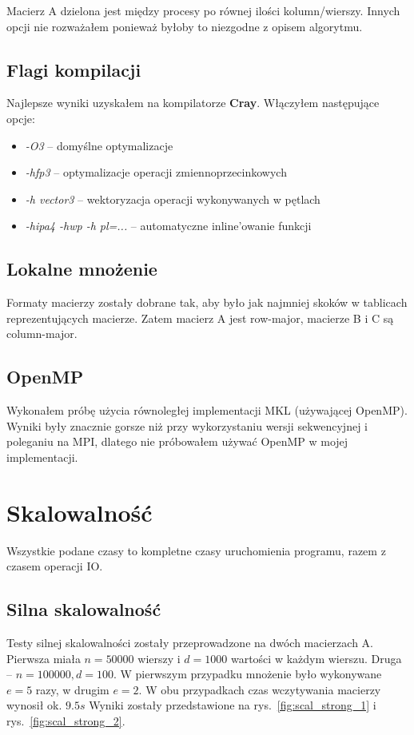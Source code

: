 \documentclass{article}
\begin{document}
Macierz A dzielona jest między procesy po równej ilości kolumn/wierszy. 
Innych opcji nie rozważałem ponieważ byłoby to niezgodne z opisem algorytmu.

\subsection{Flagi kompilacji}
Najlepsze wyniki uzyskałem na kompilatorze \textbf{Cray}. Włączyłem następujące opcje:
\begin{itemize}
  \item \emph{-O3} -- domyślne optymalizacje
  \item \emph{-hfp3} -- optymalizacje operacji zmiennoprzecinkowych
  \item \emph{-h vector3} -- wektoryzacja operacji wykonywanych w pętlach
  \item \emph{-hipa4 -hwp -h pl=...} -- automatyczne inline'owanie funkcji
\end{itemize}

\subsection{Lokalne mnożenie}
Formaty macierzy zostały dobrane tak, aby było jak najmniej skoków w tablicach reprezentujących macierze.
Zatem macierz A jest row-major, macierze B i C są column-major.

\subsection{OpenMP}
Wykonałem próbę użycia równoległej implementacji MKL (używającej OpenMP). Wyniki były znacznie gorsze niż przy
wykorzystaniu wersji sekwencyjnej i poleganiu na MPI, dlatego nie próbowałem używać OpenMP w mojej implementacji.

\section{Skalowalność}

Wszystkie podane czasy to kompletne czasy uruchomienia programu, razem z czasem operacji IO. 

\subsection{Silna skalowalność}

Testy silnej skalowalności zostały przeprowadzone na dwóch macierzach A. 
Pierwsza miała $n=50000$ wierszy i $d=1000$ wartości w każdym wierszu. Druga -- $n=100000, d=100$.
W pierwszym przypadku mnożenie było wykonywane $e=5$ razy, w drugim $e=2$.
W obu przypadkach czas wczytywania macierzy wynosił ok. $9.5s$
Wyniki zostały przedstawione na rys.~\ref{fig:scal_strong_1} i rys.~\ref{fig:scal_strong_2}.
\end{document}
